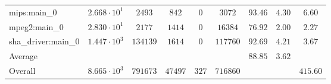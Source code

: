 \begin{tabular}{|l|c|c|c|c|c|c|c|c|}
mips:main\_0            & $ 2.668 \cdot 10^{1} $ & $ 2493   $ & $ 842   $ & $ 0   $ & $ 3072   $ & $ 93.46       $ & $ 4.30    $ & $ 6.60    $ \\
mpeg2:main\_0           & $ 2.830 \cdot 10^{1} $ & $ 2177   $ & $ 1414  $ & $ 0   $ & $ 16384  $ & $ 76.92       $ & $ 2.00    $ & $ 2.27    $ \\
sha\_driver:main\_0     & $ 1.447 \cdot 10^{3} $ & $ 134139 $ & $ 1614  $ & $ 0   $ & $ 117760 $ & $ 92.69       $ & $ 4.21    $ & $ 3.67    $ \\
\hline
Average                 & $                    $ & $        $ & $       $ & $     $ & $        $ & $ 88.85       $ & $ 3.62    $ & $         $ \\
\hline
Overall                 & $ 8.665 \cdot 10^{3} $ & $ 791673 $ & $ 47497 $ & $ 327 $ & $ 716860 $ & $             $ & $         $ & $ 415.60  $ \\
\hline
\end{tabular}
